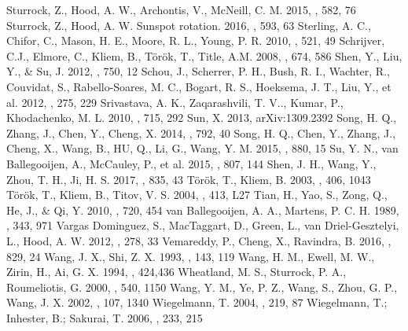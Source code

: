 \documentclass[12pt,preprint]{aastex}
\begin{document}
\begin{CJK*}{UTF8}{gbsn}
\begin{thebibliography}{}
 Sturrock, Z., Hood, A. W., Archontis, V., McNeill, C. M. 2015, \aap, 582, 76
 Sturrock, Z., Hood, A. W. Sunspot rotation. 2016, \aap, 593, 63
 Sterling, A. C., Chifor, C., Mason, H. E., Moore, R. L., Young, P. R. 2010, \apj, 521, 49 
 Schrijver, C.J., Elmore, C., Kliem, B., T{\"o}r{\"o}k, T., Title, A.M. 2008, \apj, 674, 586
 Shen, Y., Liu, Y., \& Su, J. 2012, \apj, 750, 12
 Schou, J., Scherrer, P. H., Bush, R. I., Wachter, R., Couvidat, S., Rabello-Soares, M. C., Bogart, R. S., Hoeksema, J. T., Liu, Y., et al. 2012, \solphys, 275, 229
 Srivastava, A. K., Zaqarashvili, T. V.., Kumar, P., Khodachenko, M. L. 2010, \apj, 715, 292
 Sun, X. 2013, arXiv:1309.2392
  Song, H. Q., Zhang, J., Chen, Y., Cheng, X. 2014, \apj, 792, 40
 Song, H. Q., Chen, Y., Zhang, J., Cheng, X., Wang, B., HU, Q., Li, G., Wang, Y. M. 2015, \apjl, 880, 15
 Su, Y. N., van Ballegooijen, A., McCauley, P., et al. 2015, \apj, 807, 144 
 Shen, J. H., Wang, Y., Zhou, T. H., Ji, H. S. 2017, \apj, 835, 43
 T{\"o}r{\"o}k, T., Kliem, B. 2003, \aap, 406, 1043
 T{\"o}r{\"o}k, T., Kliem, B., Titov, V. S. 2004, \aap, 413, L27
 Tian, H., Yao, S., Zong, Q., He, J., \& Qi, Y. 2010, \apj, 720, 454
 van Ballegooijen, A. A., Martens, P. C. H. 1989, \apj, 343, 971
 Vargas Dominguez, S., MacTaggart, D., Green, L., van Driel-Gesztelyi, L., Hood, A. W. 2012, \solphys, 278, 33
 Vemareddy, P., Cheng, X., Ravindra, B. 2016, \apj, 829, 24
 Wang, J. X., Shi, Z. X. 1993, \solphys, 143, 119
  Wang, H. M., Ewell, M. W., Zirin, H., Ai, G. X. 1994, \apj, 424,436
 Wheatland, M. S., Sturrock, P. A., Roumeliotis, G. 2000, \apj, 540, 1150
 Wang, Y. M., Ye, P. Z., Wang, S., Zhou, G. P., Wang, J. X. 2002, \jgr, 107, 1340
 Wiegelmann, T. 2004, \solphys, 219, 87
 Wiegelmann, T.; Inhester, B.; Sakurai, T. 2006, \solphys, 233, 215

\end{thebibliography}
\end{CJK*}
\end{document}
